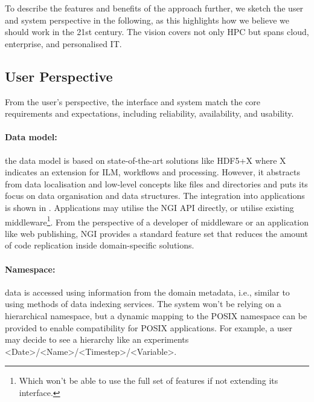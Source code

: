 \documentclass[a4paper, twocolumn]{article}
\begin{document}
To describe the features and benefits of the approach further, we sketch the user and system perspective in the following, as this highlights how we believe we should work in the 21st century.
The vision covers not only HPC but spans cloud, enterprise, and personalised IT.

\subsection{User Perspective}

\newcommand{\bnf}[1]{\textless #1\textgreater}

From the user's perspective, the interface and system match the core requirements and expectations, including reliability, availability, and usability.

\paragraph{Data model:} the data model is based on state-of-the-art solutions like HDF5+X where X indicates an extension for ILM, workflows and processing.
However, it abstracts from data localisation and low-level concepts like files and directories and puts its focus on data organisation and data structures.
The integration into applications is shown in .
Applications may utilise the NGI API directly, or utilise existing middleware\footnote{Which won't be able to use the full set of features if not extending its interface.}.
From the perspective of a developer of middleware or an application like web publishing, NGI provides a standard feature set that reduces the amount of code replication inside domain-specific solutions.


\paragraph{Namespace:} data is accessed using information from the domain metadata, i.e., similar to using methods of data indexing services.
The system won't be relying on a hierarchical namespace, but a dynamic mapping to the POSIX namespace can be provided to enable compatibility for POSIX applications.
For example, a user may decide to see a hierarchy like an experiments \bnf{Date}/\bnf{Name}/\bnf{Timestep}/\bnf{Variable}.
\end{document}
